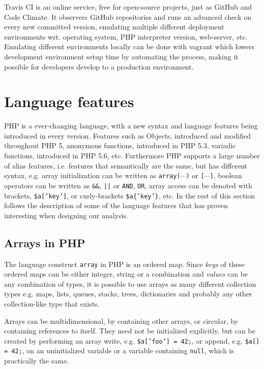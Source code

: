 Travis CI is an online service, free for open-source projects, just as GitHub and Code Climate. It observers GitHub repositories and runs an advanced check on every new committed version, emulating multiple different deployment environments wrt. operating system, PHP interpreter version, web-server, etc. Emulating different environments locally can be done with vagrant which lowers development environment setup time by automating the process, making it possible for developers develop to a production environment.


\section{Language features}
PHP is a ever-changing language, with a new syntax and language features being introduced in every version. Features such as Objects, introduced and modified throughout PHP 5, anonymous functions, introduced in PHP 5.3, variadic functions, introduced in PHP 5.6, etc. Furthermore PHP supports a large number of alias features, i.e. features that semantically are the same, but has different syntax, e.g. array initialization can be written as \texttt{array($\cdots$)} or \texttt{[$\cdots$]}, boolean operators can be written as \texttt{\&\&}, \texttt{||} or \texttt{AND}, \texttt{OR}, array access can be denoted with brackets, \texttt{\$a['key']}, or curly-brackets \texttt{\$a\{'key'\}}, etc. In the rest of this section follows the description of some of the language features that has proven interesting when designing our analysis.

\subsection{Arrays in PHP}
The language construct \texttt{array} in PHP is an ordered map. Since \emph{keys} of these ordered maps can be either integer, string or a combination and \emph{values} can be any combination of types, it is possible to use arrays as many different collection types e.g. maps, lists, queues, stacks, trees, dictionaries and probably any other collection-like type that exists. 

Arrays can be multidimensional, by containing other arrays, or circular, by containing references to itself. They need not be initialized explicitly, but can be created by performing an array write, e.g. \texttt{\$a['foo'] = 42;}, or append, e.g. \texttt{\$a[] = 42;}, on an uninitialized variable or a variable containing \texttt{null}, which is practically the same.

